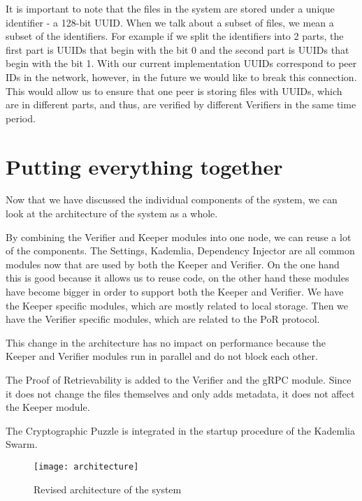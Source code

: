 It is important to note that the files in the system are stored under a unique identifier - a 128-bit UUID.
When we talk about a subset of files, we mean a subset of the identifiers.
For example if we split the identifiers into 2 parts, the first part is UUIDs that begin with the bit 0 and the second part is UUIDs that begin with the bit 1.
With our current implementation UUIDs correspond to peer IDs in the network, however, in the future we would like to break this connection.
This would allow us to ensure that one peer is storing files with UUIDs, which are in different parts, and thus, are verified by different Verifiers in the same time period.

\section{Putting everything together}

Now that we have discussed the individual components of the system, we can look at the architecture of the system as a whole.

By combining the Verifier and Keeper modules into one node, we can reuse a lot of the components.
The Settings, Kademlia, Dependency Injector are all common modules now that are used by both the Keeper and Verifier.
On the one hand this is good because it allows us to reuse code, on the other hand these modules have become bigger in order to support both the Keeper and Verifier.
We have the Keeper specific modules, which are mostly related to local storage.
Then we have the Verifier specific modules, which are related to the PoR protocol.

This change in the architecture has no impact on performance because the Keeper and Verifier modules run in parallel and do not block each other.

The Proof of Retrievability is added to the Verifier and the gRPC module.
Since it does not change the files themselves and only adds metadata, it does not affect the Keeper module.

The Cryptographic Puzzle is integrated in the startup procedure of the Kademlia Swarm.

\begin{figure}
    \centering
    \texttt{[image: architecture]}
    \caption{Revised architecture of the system}
\end{figure}
